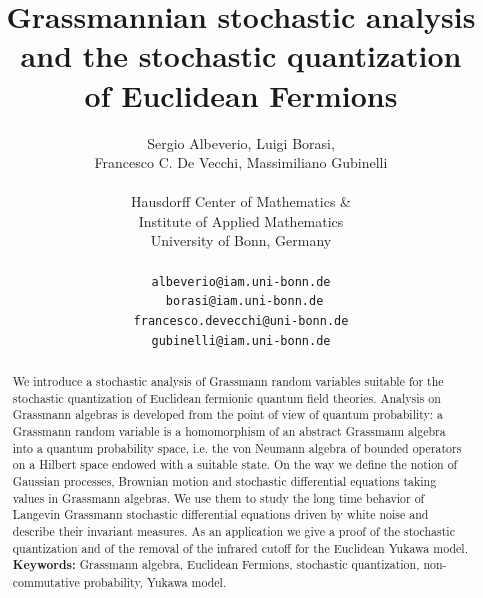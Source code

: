 \documentclass{article}
\newcommand{\tmaffiliation}[1]{\\ #1}
\newcommand{\tmkeywords}{\textbf{Keywords:} }
\begin{document}
\title{
  Grassmannian stochastic analysis\\
  and the stochastic quantization\\
  of Euclidean Fermions
}

\author{Sergio Albeverio, Luigi Borasi,\\ Francesco C. De Vecchi, Massimiliano Gubinelli\\[.5em]
  \tmaffiliation{Hausdorff Center of Mathematics \&\\
  Institute of Applied Mathematics\\
  University of Bonn, Germany}\\ 
  \\
  \tt{albeverio@iam.uni-bonn.de}\\
 \tt{ borasi@iam.uni-bonn.de}\\
  \tt{francesco.devecchi@uni-bonn.de}\\
 \tt{ gubinelli@iam.uni-bonn.de}
}

\maketitle

\begin{abstract}
  We introduce a stochastic analysis of Grassmann random variables suitable
  for the stochastic quantization of Euclidean fermionic quantum field
  theories. Analysis on Grassmann algebras is developed from the point of view
  of quantum probability: a Grassmann random variable is a homomorphism of an
  abstract Grassmann algebra into a quantum probability space, i.e. the von
  Neumann algebra of bounded operators on a Hilbert space endowed with a
  suitable state. On the way we define the notion of Gaussian processes,
  Brownian motion and stochastic differential equations taking values in
  Grassmann algebras. We use them to study the long time behavior of Langevin
  Grassmann stochastic differential equations driven by white noise and
  describe their invariant measures. As an application we give a proof of the
  stochastic quantization and of the removal of the infrared cutoff for the
  Euclidean Yukawa model.\\[.4em]

{\small 
\noindent \tmkeywords{Grassmann algebra, Euclidean Fermions, stochastic quantization,
non-commutative probability, Yukawa model.}}

\end{abstract}

{\tableofcontents}
\end{document}
